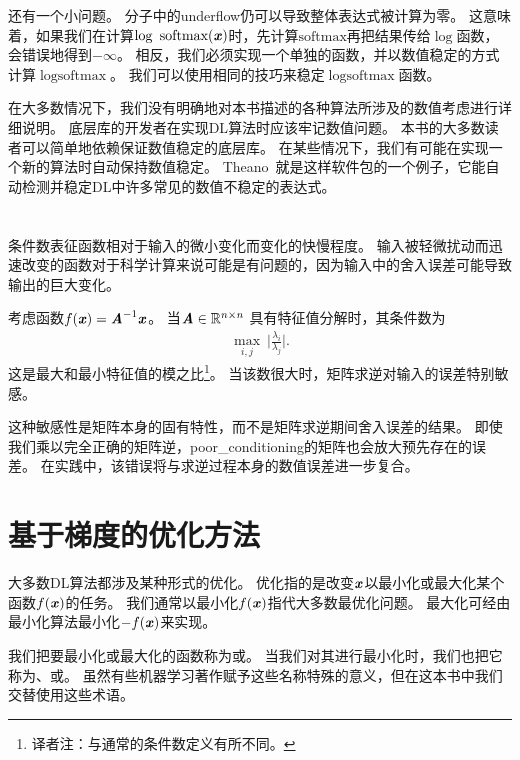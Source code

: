 还有一个小问题。
分子中的\gls{underflow}仍可以导致整体表达式被计算为零。
这意味着，如果我们在计算$\log ~\text{softmax}(\boldsymbol{\mathit{x}})$时，先计算$\text{softmax}$再把结果传给$\log$函数，会错误地得到$-\infty$。
相反，我们必须实现一个单独的函数，并以数值稳定的方式计算$\log \text{softmax}$。
我们可以使用相同的技巧来稳定$\log \text{softmax}$函数。

在大多数情况下，我们没有明确地对本书描述的各种算法所涉及的数值考虑进行详细说明。
底层库的开发者在实现\gls{DL}算法时应该牢记数值问题。
本书的大多数读者可以简单地依赖保证数值稳定的底层库。
在某些情况下，我们有可能在实现一个新的算法时自动保持数值稳定。
Theano~\citep{bergstra+al:2010-scipy,Bastien-2012}就是这样软件包的一个例子，它能自动检测并稳定\gls{DL}中许多常见的数值不稳定的表达式。


\section{}
\label{sec:poor_conditioning}

条件数表征函数相对于输入的微小变化而变化的快慢程度。
输入被轻微扰动而迅速改变的函数对于科学计算来说可能是有问题的，因为输入中的舍入误差可能导致输出的巨大变化。

考虑函数$f(\boldsymbol{\mathit{x}}) = \boldsymbol{\mathit{A}}^{-1} \boldsymbol{\mathit{x}}$。
当$\boldsymbol{\mathit{A}} \in \mathbb{R}^{n \times n}$ 具有特征值分解时，其条件数为
\begin{align}
 \underset{i,j}{\max}~ \Bigg| \frac{\lambda_i}{ \lambda_j} \Bigg|.
\end{align}
这是最大和最小特征值的模之比\footnote{译者注：与通常的条件数定义有所不同。}。
当该数很大时，矩阵求逆对输入的误差特别敏感。

这种敏感性是矩阵本身的固有特性，而不是矩阵求逆期间舍入误差的结果。
即使我们乘以完全正确的矩阵逆，\gls{poor_conditioning}的矩阵也会放大预先存在的误差。
在实践中，该错误将与求逆过程本身的数值误差进一步复合。



\section{基于梯度的优化方法}
\label{sec:gradient_based_optimization}

大多数\gls{DL}算法都涉及某种形式的优化。
优化指的是改变$\boldsymbol{\mathit{x}}$以最小化或最大化某个函数$f(\boldsymbol{\mathit{x}})$的任务。
我们通常以最小化$f(\boldsymbol{\mathit{x}})$指代大多数最优化问题。
最大化可经由最小化算法最小化$-f(\boldsymbol{\mathit{x}})$来实现。

我们把要最小化或最大化的函数称为或。
当我们对其进行最小化时，我们也把它称为、或。
虽然有些机器学习著作赋予这些名称特殊的意义，但在这本书中我们交替使用这些术语。

